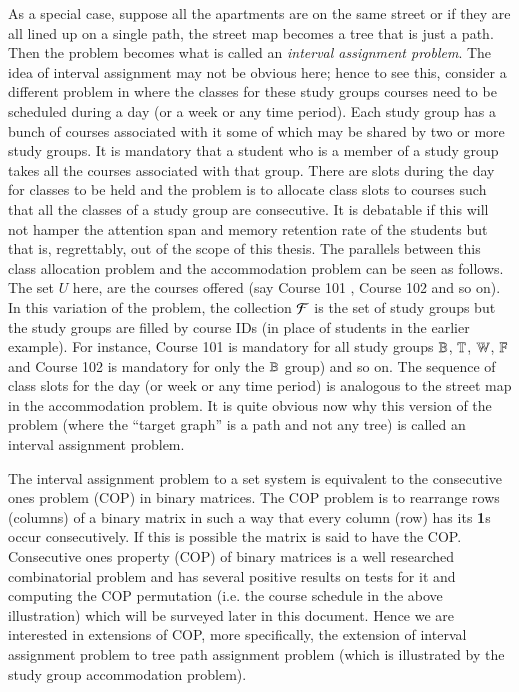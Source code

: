 \documentclass[MS,synopsis]{iitmdiss}
\def \un {\bf 1}
\begin{document}
As a special case, suppose all the apartments are on the same street
or if they are all lined up on a single path, the street map becomes a
tree that is just a path. Then the problem becomes what is called an
{\em interval assignment problem}. The idea of interval assignment may
not be obvious here; hence to see this, consider a different problem
in {\WSI} where the classes for these study groups courses need to be
scheduled during a day (or a week or any time period). Each study
group has a bunch of courses associated with it some of which may be
shared by two or more study groups. It is mandatory that a student who
is a member of a study group takes all the courses associated with
that group. There are slots during the day for classes to be held and
the problem is to allocate class slots to courses such that all the
classes of a study group are consecutive. It is debatable if this will
not hamper the attention span and memory retention rate of the
students but that is, regrettably, out of the scope of this
thesis. The parallels between this class allocation problem and the
accommodation problem can be seen as follows. The set $U$ here, are
the courses offered (say Course 101 {\coneohone}, Course 102
{\coneohtwo} and so on). In this variation of the problem, the
collection ${\cal F}$ is the set of study groups but the study groups are
filled by course IDs (in place of students in the earlier
example). For instance, Course 101 is mandatory for all study groups
$\mathbb{B}$, $\mathbb{T}$, $\mathbb{W}$, $\mathbb{F}$ and Course 102 is mandatory for
only the $\mathbb{B}$ group) and so on. The sequence of class slots for the
day (or week or any time period) is analogous to the street map in the
accommodation problem. It is quite obvious now why this version of the
problem (where the ``target graph'' is a path and not any
tree) is called an interval assignment
problem.

The interval assignment problem to a set system is equivalent to the
consecutive ones problem (COP) in binary matrices\cite{wlh02,
  nsnrs09}.  The COP problem is to rearrange rows (columns) of a
binary matrix in such a way that every column (row) has its {\un}s occur
consecutively. If this is possible the matrix is said to have the COP.
Consecutive ones property (COP) of binary matrices is a well
researched combinatorial problem and has several positive results on
tests for it and computing the COP permutation (i.e. the course
schedule in the above illustration) which will be surveyed later in
this document. Hence we are interested in extensions of COP, more
specifically, the extension of interval assignment problem to tree
path assignment problem (which is illustrated by the study group
accommodation problem).
\end{document}
